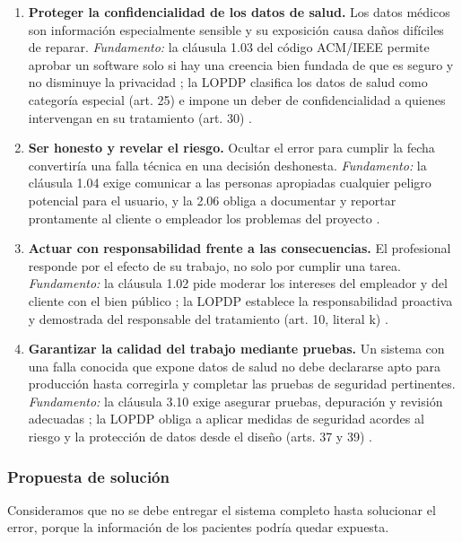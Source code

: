 \documentclass[12pt,a4paper,oneside]{article}
\newcommand{\cita}[1]{\cite{#1}}
\begin{document}
\begin{enumerate}[leftmargin=1.8em,itemsep=4pt]
    \item \textbf{Proteger la confidencialidad de los datos de salud.} Los datos médicos son información especialmente sensible y su exposición causa daños difíciles de reparar. \emph{Fundamento:} la cláusula 1.03 del código ACM/IEEE permite aprobar un software solo si hay una creencia bien fundada de que es seguro y no disminuye la privacidad \cita{ref:acm}; la LOPDP clasifica los datos de salud como categoría especial (art. 25) e impone un deber de confidencialidad a quienes intervengan en su tratamiento (art. 30) \cita{ref:lopdp}.
    \item \textbf{Ser honesto y revelar el riesgo.} Ocultar el error para cumplir la fecha convertiría una falla técnica en una decisión deshonesta. \emph{Fundamento:} la cláusula 1.04 exige comunicar a las personas apropiadas cualquier peligro potencial para el usuario, y la 2.06 obliga a documentar y reportar prontamente al cliente o empleador los problemas del proyecto \cita{ref:acm}.
    \item \textbf{Actuar con responsabilidad frente a las consecuencias.} El profesional responde por el efecto de su trabajo, no solo por cumplir una tarea. \emph{Fundamento:} la cláusula 1.02 pide moderar los intereses del empleador y del cliente con el bien público \cita{ref:acm}; la LOPDP establece la responsabilidad proactiva y demostrada del responsable del tratamiento (art. 10, literal k) \cita{ref:lopdp}.
    \item \textbf{Garantizar la calidad del trabajo mediante pruebas.} Un sistema con una falla conocida que expone datos de salud no debe declararse apto para producción hasta corregirla y completar las pruebas de seguridad pertinentes. \emph{Fundamento:} la cláusula 3.10 exige asegurar pruebas, depuración y revisión adecuadas \cita{ref:acm}; la LOPDP obliga a aplicar medidas de seguridad acordes al riesgo y la protección de datos desde el diseño (arts. 37 y 39) \cita{ref:lopdp}.
\end{enumerate}

\subsubsection{Propuesta de solución}

Consideramos que no se debe entregar el sistema completo hasta solucionar el error, porque la información de los pacientes podría quedar expuesta.
\end{document}
